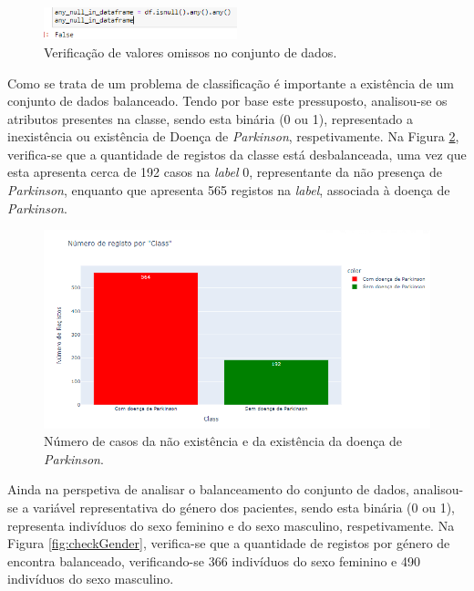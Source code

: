 \documentclass[12pt,a4paper,twoside]{report}
\begin{document}
{\begin{figure}[H]
    \centering
    \includegraphics[width=0.5\textwidth]{imagens/checkNulls.png}
    \caption{Verificação de valores omissos no conjunto de dados.}
    \label{fig:checkNulls}
\end{figure}

Como se trata de um problema de classificação é importante a existência de um conjunto de dados balanceado. Tendo por base este pressuposto, analisou-se os atributos presentes na classe, sendo esta binária (0 ou 1), representado a inexistência ou existência de Doença de \textit{Parkinson}, respetivamente. Na Figura \ref{fig:checkClass}, verifica-se que a quantidade de registos da classe está desbalanceada, uma vez que esta apresenta cerca de 192 casos na \textit{label} 0, representante da não presença de \textit{Parkinson}, enquanto que apresenta 565 registos na \textit{label}, associada à doença de \textit{Parkinson}.

\begin{figure}[H]
    \centering
    \includegraphics[width=1\textwidth]{imagens/classDistribution.png}
    \caption{Número de casos da não existência e da existência da doença de \textit{Parkinson}.}
    \label{fig:checkClass}
\end{figure}

Ainda na perspetiva de analisar o balanceamento do conjunto de dados, analisou-se a variável representativa do género dos pacientes, sendo esta binária (0 ou 1), representa indivíduos do sexo feminino e do sexo masculino, respetivamente. Na Figura \ref{fig:checkGender}, verifica-se que a quantidade de registos por género de encontra balanceado, verificando-se 366 indivíduos do sexo feminino e 490 indivíduos do sexo masculino.

}
\end{document}
